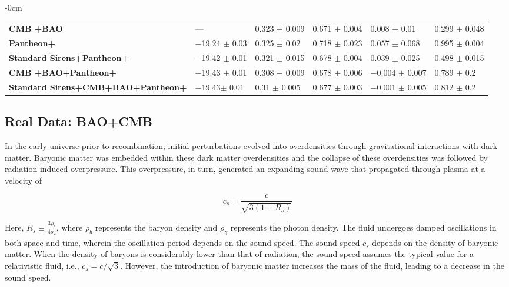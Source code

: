 \documentclass[universe,article,accept,moreauthors,pdftex]{Definitions/mdpi}
\begin{document}
\begin{table}[H]
\begin{adjustwidth}{-\extralength}{0cm}
\begin{tabular}{C{4cm}C{2cm}C{2cm}C{2cm}C{3cm}C{4cm}}
\textbf{CMB +BAO} & --- & 0.323 $\pm$ 0.009  &0.671 $\pm$ 0.004 &0.008 $\pm$ 0.01 & 0.299 $\pm$ 0.048\\ 

\textbf{Pantheon+} &$-$19.24 $\pm$ 0.03 & 0.325 $\pm$ 0.02 &0.718 $\pm$ 0.023 & 0.057 $\pm$ 0.068 & 0.995 $\pm$ 0.004\\ 


\textbf{Standard Sirens+Pantheon+} & $-$19.42 $\pm$ 0.01 &0.321 $\pm$ 0.015 &0.678 $\pm$ 0.004 &0.039 $\pm$ 0.025 &0.498 $\pm$ 0.015\\ 

\textbf{CMB +BAO+Pantheon+} & $-$19.43 $\pm$ 0.01 &0.308 $\pm$ 0.009 &0.678 $\pm$ 0.006 &$-$0.004 $\pm$ 0.007 &0.789 $\pm$ 0.2\\ 



\textbf{Standard Sirens+CMB+BAO+Pantheon+} & $-$19.43$\pm$ 0.01 &0.31 $\pm$ 0.005 &0.677 $\pm$ 0.003 &$-$0.001 $\pm$ 0.005 &0.812 $\pm$ 0.2\\ 


\bottomrule
\end{tabular}
\end{adjustwidth}
\end{table}
\newpage
\subsection{Real Data: BAO+CMB}\label{subsec:3.2}
 


In the early universe prior to recombination, initial perturbations evolved into overdensities through gravitational interactions with dark matter. Baryonic matter was embedded within these dark matter overdensities and the collapse of these overdensities was followed by radiation-induced overpressure. This overpressure, in turn, generated an expanding sound wave that propagated through plasma at a velocity of 

\begin{equation}
c_{s}=\frac{c}{\sqrt{3(1+R_{s})}}
\end{equation}

Here, $R_{s}\equiv\frac{3 \rho_{b}}{4 \rho_{\gamma}}$, where $\rho_{b}$ represents the baryon density and $\rho_{\gamma}$ represents the photon density. The fluid undergoes damped oscillations in both space and time, wherein the oscillation period depends on the sound speed.  The sound speed $c_{s}$  depends on the density of baryonic matter. When the density of baryons is considerably lower than that of radiation, the sound speed assumes the typical value for a relativistic fluid, i.e., $c_s = c/\sqrt{3}$. However, the introduction of baryonic matter increases the mass of the fluid, leading to a decrease in the sound speed. 
\end{document}
